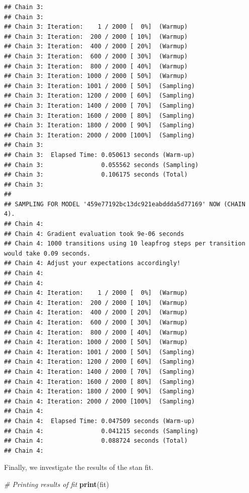 \documentclass[
]{article}
\newenvironment{Shaded}{\begin{snugshade}}{\end{snugshade}}
\newcommand{\CommentTok}[1]{\textcolor[rgb]{0.56,0.35,0.01}{\textit{#1}}}
\newcommand{\KeywordTok}[1]{\textcolor[rgb]{0.13,0.29,0.53}{\textbf{#1}}}
\newcommand{\NormalTok}[1]{#1}
\begin{document}
\begin{verbatim}
## Chain 3: 
## Chain 3: 
## Chain 3: Iteration:    1 / 2000 [  0%]  (Warmup)
## Chain 3: Iteration:  200 / 2000 [ 10%]  (Warmup)
## Chain 3: Iteration:  400 / 2000 [ 20%]  (Warmup)
## Chain 3: Iteration:  600 / 2000 [ 30%]  (Warmup)
## Chain 3: Iteration:  800 / 2000 [ 40%]  (Warmup)
## Chain 3: Iteration: 1000 / 2000 [ 50%]  (Warmup)
## Chain 3: Iteration: 1001 / 2000 [ 50%]  (Sampling)
## Chain 3: Iteration: 1200 / 2000 [ 60%]  (Sampling)
## Chain 3: Iteration: 1400 / 2000 [ 70%]  (Sampling)
## Chain 3: Iteration: 1600 / 2000 [ 80%]  (Sampling)
## Chain 3: Iteration: 1800 / 2000 [ 90%]  (Sampling)
## Chain 3: Iteration: 2000 / 2000 [100%]  (Sampling)
## Chain 3: 
## Chain 3:  Elapsed Time: 0.050613 seconds (Warm-up)
## Chain 3:                0.055562 seconds (Sampling)
## Chain 3:                0.106175 seconds (Total)
## Chain 3: 
## 
## SAMPLING FOR MODEL '459e77192bc13dc921eabddda5d77169' NOW (CHAIN 4).
## Chain 4: 
## Chain 4: Gradient evaluation took 9e-06 seconds
## Chain 4: 1000 transitions using 10 leapfrog steps per transition would take 0.09 seconds.
## Chain 4: Adjust your expectations accordingly!
## Chain 4: 
## Chain 4: 
## Chain 4: Iteration:    1 / 2000 [  0%]  (Warmup)
## Chain 4: Iteration:  200 / 2000 [ 10%]  (Warmup)
## Chain 4: Iteration:  400 / 2000 [ 20%]  (Warmup)
## Chain 4: Iteration:  600 / 2000 [ 30%]  (Warmup)
## Chain 4: Iteration:  800 / 2000 [ 40%]  (Warmup)
## Chain 4: Iteration: 1000 / 2000 [ 50%]  (Warmup)
## Chain 4: Iteration: 1001 / 2000 [ 50%]  (Sampling)
## Chain 4: Iteration: 1200 / 2000 [ 60%]  (Sampling)
## Chain 4: Iteration: 1400 / 2000 [ 70%]  (Sampling)
## Chain 4: Iteration: 1600 / 2000 [ 80%]  (Sampling)
## Chain 4: Iteration: 1800 / 2000 [ 90%]  (Sampling)
## Chain 4: Iteration: 2000 / 2000 [100%]  (Sampling)
## Chain 4: 
## Chain 4:  Elapsed Time: 0.047509 seconds (Warm-up)
## Chain 4:                0.041215 seconds (Sampling)
## Chain 4:                0.088724 seconds (Total)
## Chain 4:
\end{verbatim}

Finally, we investigate the results of the stan fit.

\begin{Shaded}
\begin{Highlighting}[]
\CommentTok{# Printing results of fit}
\KeywordTok{print}\NormalTok{(fit)}
\end{Highlighting}
\end{Shaded}
\end{document}
